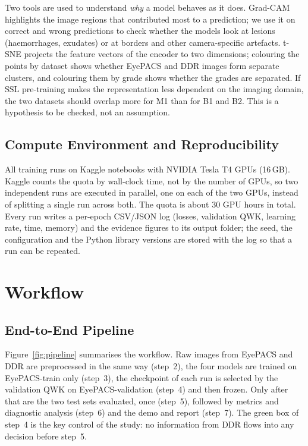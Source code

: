 Two tools are used to understand \emph{why} a model behaves as it does. Grad-CAM \cite{gradcam2017} highlights the image regions that contributed most to a prediction; we use it on correct and wrong predictions to check whether the models look at lesions (haemorrhages, exudates) or at borders and other camera-specific artefacts. t-SNE \cite{tsne2008} projects the feature vectors of the encoder to two dimensions; colouring the points by dataset shows whether EyePACS and DDR images form separate clusters, and colouring them by grade shows whether the grades are separated. If SSL pre-training makes the representation less dependent on the imaging domain, the two datasets should overlap more for M1 than for B1 and B2. This is a hypothesis to be checked, not an assumption.

\subsection{Compute Environment and Reproducibility}
\label{subsec:compute}

All training runs on Kaggle notebooks with NVIDIA Tesla T4 GPUs (16\,GB). Kaggle counts the quota by wall-clock time, not by the number of GPUs, so two independent runs are executed in parallel, one on each of the two GPUs, instead of splitting a single run across both. The quota is about 30 GPU hours in total. Every run writes a per-epoch CSV/JSON log (losses, validation QWK, learning rate, time, memory) and the evidence figures to its output folder; the seed, the configuration and the Python library versions are stored with the log so that a run can be repeated.

\section{Workflow}
\label{sec:workflow}

\subsection{End-to-End Pipeline}
\label{subsec:pipeline}

Figure~\ref{fig:pipeline} summarises the workflow. Raw images from EyePACS and DDR are preprocessed in the same way (step~2), the four models are trained on EyePACS-train only (step~3), the checkpoint of each run is selected by the validation QWK on EyePACS-validation (step~4) and then frozen. Only after that are the two test sets evaluated, once (step~5), followed by metrics and diagnostic analysis (step~6) and the demo and report (step~7). The green box of step~4 is the key control of the study: no information from DDR flows into any decision before step~5.

